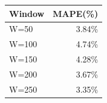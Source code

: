 {\tiny\setlength{\tabcolsep}{2pt}\begin{tabular}{lr} \toprule
Window & MAPE(\%) \\ \midrule
W=50 & 3.84\% \\ 
W=100 & 4.74\% \\ 
W=150 & 4.28\% \\ 
W=200 & 3.67\% \\ 
W=250 & 3.35\% \\ 
\bottomrule \end{tabular}}